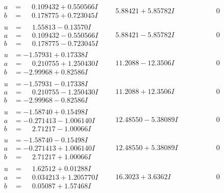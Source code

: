 \documentclass[1p]{elsarticle_modified}
\theoremstyle{definition}
\begin{document}
$$\begin{array}{c|c|c}
\begin{aligned}
a &= \phantom{-}0.109432 + 0.550566 I \\
b &= \phantom{-}0.178775 + 0.723045 I\end{aligned}
 & \phantom{-}5.88421 + 5.85782 I & \phantom{-0.000000 } 0 \\ \hline\begin{aligned}
u &= \phantom{-}1.55813 - 0.13570 I \\
a &= \phantom{-}0.109432 - 0.550566 I \\
b &= \phantom{-}0.178775 - 0.723045 I\end{aligned}
 & \phantom{-}5.88421 - 5.85782 I & \phantom{-0.000000 } 0 \\ \hline\begin{aligned}
u &= -1.57931 + 0.17338 I \\
a &= \phantom{-}0.210755 + 1.250430 I \\
b &= -2.99968 + 0.82586 I\end{aligned}
 & \phantom{-}11.2088 - 12.3506 I & \phantom{-0.000000 } 0 \\ \hline\begin{aligned}
u &= -1.57931 - 0.17338 I \\
a &= \phantom{-}0.210755 - 1.250430 I \\
b &= -2.99968 - 0.82586 I\end{aligned}
 & \phantom{-}11.2088 + 12.3506 I & \phantom{-0.000000 } 0 \\ \hline\begin{aligned}
u &= -1.58740 + 0.15498 I \\
a &= -0.271413 - 1.006140 I \\
b &= \phantom{-}2.71217 - 1.00066 I\end{aligned}
 & \phantom{-}12.48550 - 5.38089 I & \phantom{-0.000000 } 0 \\ \hline\begin{aligned}
u &= -1.58740 - 0.15498 I \\
a &= -0.271413 + 1.006140 I \\
b &= \phantom{-}2.71217 + 1.00066 I\end{aligned}
 & \phantom{-}12.48550 + 5.38089 I & \phantom{-0.000000 } 0 \\ \hline\begin{aligned}
u &= \phantom{-}1.62512 + 0.01288 I \\
a &= \phantom{-}0.034213 + 1.205770 I \\
b &= \phantom{-}0.05087 + 1.57468 I\end{aligned}
 & \phantom{-}16.3023 + 3.6362 I & \phantom{-0.000000 } 0 \\ \hline\begin{aligned}

\end{aligned}
\end{array}$$
\end{document}
